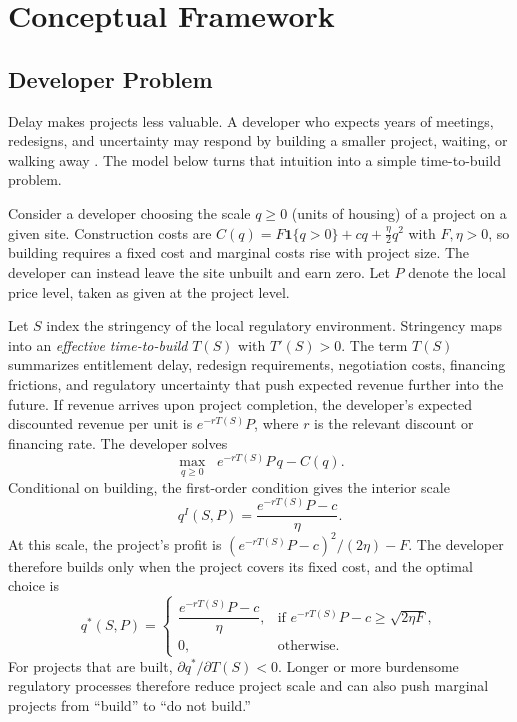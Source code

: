 
\section{Conceptual Framework}
\label{sec:model}
\subsection{Developer Problem}
\label{subsec:developer_problem}

Delay makes projects less valuable.
A developer who expects years of meetings, redesigns, and uncertainty may respond by building a smaller project, waiting, or walking away \citep{kydland_time_1982}.
The model below turns that intuition into a simple time-to-build problem.

Consider a developer choosing the scale $q \geq 0$ (units of housing) of a project on a given site.
Construction costs are $C(q) = F\mathbf{1}\{q>0\} + cq + \frac{\eta}{2}q^2$ with $F,\eta > 0$, so building requires a fixed cost and marginal costs rise with project size.
The developer can instead leave the site unbuilt and earn zero.
Let $P$ denote the local price level, taken as given at the project level.

Let $S$ index the stringency of the local regulatory environment.
Stringency maps into an \textit{effective time-to-build} $T(S)$ with $T'(S) > 0$.
The term $T(S)$ summarizes entitlement delay, redesign requirements, negotiation costs, financing frictions, and regulatory uncertainty that push expected revenue further into the future.
If revenue arrives upon project completion, the developer's expected discounted revenue per unit is $e^{-rT(S)} P$, where $r$ is the relevant discount or financing rate.
The developer solves
\[
\max_{q \geq 0} \;\; e^{-rT(S)} P \, q - C(q).
\]
Conditional on building, the first-order condition gives the interior scale
\[
q^I(S,P) = \frac{e^{-rT(S)}P-c}{\eta}.
\]
At this scale, the project's profit is $\left(e^{-rT(S)}P-c\right)^2/(2\eta)-F$.
The developer therefore builds only when the project covers its fixed cost, and the optimal choice is
\[
q^*(S,P) =
\begin{cases}
\dfrac{e^{-rT(S)}P-c}{\eta},
& \text{if } e^{-rT(S)}P-c \geq \sqrt{2\eta F}, \\
0, & \text{otherwise.}
\end{cases}
\]
For projects that are built, $\partial q^*/\partial T(S)<0$.
Longer or more burdensome regulatory processes therefore reduce project scale and can also push marginal projects from ``build'' to ``do not build.''

